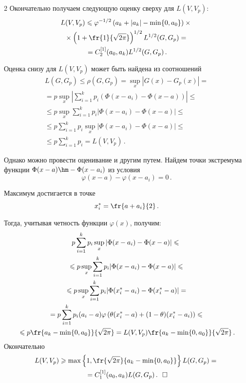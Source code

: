 \begin{multicols}{2}
Окончательно получаем следующую оценку сверху для
$L(V,V_p)$:
\begin{multline*}
L(V,V_p)\leqslant\varphi^{-1/2}\left(a_k+|a_k|-\min\{0,a_0\}\right)\times{}\\
{}\times
\left(1+\fr{1}{\sqrt{2\pi}}\right)^{1/2}L^{1/2}(G,G_p)={}\\
{}=
C_2^{[1]}(a_0,a_k)L^{1/2}(G,G_p)\,.
\end{multline*}

Оценка снизу для $L(V,V_p)$ может быть найдена из соотношений
\begin{multline*}
L(G,G_p)\leqslant\rho(G,G_p)=\sup\limits_x|G(x)-G_p(x)|={}\\
{}=p\sup\limits_x\left|\sum\limits_{i=1}^k
p_i(\Phi(x-a_i)-\Phi(x-a))\right|
\leqslant{}\\
{}\leqslant
 p\sup\limits_x\sum\limits_{i=1}^k
p_i|\Phi(x-a_i)-\Phi(x-a)|\leqslant{}\\
{}\leqslant p\sum\limits_{i=1}^k
p_i\sup\limits_x|\Phi(x-a_i)-\Phi(x-a)|\leqslant{}\\
{}\leqslant
p\sum\limits_{i=1}^k p_i= L(V,V_p)\,.
\end{multline*}

Однако можно провести оценивание и другим путем. Найдем точки
экстремума функции $\Phi(x-a)\hm-\Phi(x-a_i)$ из условия
$$
\varphi(x-a)-\varphi(x-a_i)=0\,.
$$

Максимум достигается в точке
$$
x_i^*=\fr{a+a_i}{2}\,.
$$

\pagebreak

\noindent
Тогда, учитывая четность функции $\varphi(x)$, получим:
\begin{multline*}
p\sum\limits_{i=1}^k
p_i\sup\limits_x|\Phi(x-a_i)-\Phi(x-a)|\leqslant{}\\
{}\leqslant
p\sup\limits_x\sum\limits_{i=1}^k
p_i|\Phi(x-a_i)-\Phi(x-a)|\leqslant{}\\
{}\leqslant p\sup\limits_x\sum\limits_{i=1}^k
p_i|\Phi(x_i^*-a_i)-\Phi(x_i^*-a)|
={}\\
{}= p\sum\limits_{i=1}^k
p_i(a_i-a)\varphi\left(\theta(x_i^*-a)+(1-\theta)(x_i^*-a_i)\right)\leqslant{}\\
{}\leqslant p\fr{a_k-\min\{0,a_0\}}{\sqrt{2\pi}}
=L(V,V_p)\fr{a_k-\min\{0,a_0\}}{\sqrt{2\pi}}\,.
\end{multline*}
%
Окончательно
\begin{multline*}
L(V,V_p)\geqslant\max\left\{1,\fr{\sqrt{2\pi}}{a_k-\min\{0,a_0\}}\right\}
L(G,G_p)={}\\
{}=C_1^{[1]}(a_0,a_k)L(G,G_p)\,.~~\square
\end{multline*}



\end{multicols}
